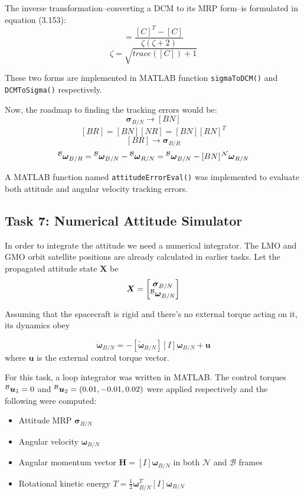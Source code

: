 \documentclass[12pt,a4paper]{report}
\begin{document}
	The inverse transformation--converting a DCM to its MRP form--is formulated in equation (3.153):
	\begin{equation}[\tilde{\boldsymbol{\sigma}}] = \frac{[C]^T - [C]}{\zeta(\zeta+2)} \end{equation}
	$$\zeta = \sqrt{trace([C])+1}$$
	
	These two forms are implemented in MATLAB function \texttt{sigmaToDCM()} and \texttt{DCMToSigma()} respectively. 
	
	Now, the roadmap to finding the tracking errors would be:
	$$\boldsymbol{\sigma}_{B/N} \rightarrow [BN] $$	
	$$[BR] = [BN][NR] = [BN][RN]^T$$
	$$[BR] \rightarrow \boldsymbol{\sigma}_{B/R}$$
	$$\prescript{\mathcal{B}}{}{\boldsymbol{\omega}}_{B/R} = \prescript{\mathcal{B}}{}{\boldsymbol{\omega}}_{B/N} - \prescript{\mathcal{B}}{}{\boldsymbol{\omega}}_{R/N} = \prescript{\mathcal{B}}{}{\boldsymbol{\omega}}_{B/N} - [BN]\prescript{\mathcal{N}}{}{\boldsymbol{\omega}}_{R/N}$$
	
	A MATLAB function named \texttt{attitudeErrorEval()} was implemented to evaluate both attitude and angular velocity tracking errors.
	
	\subsection{Task 7: Numerical Attitude Simulator}
	
	In order to integrate the attitude we need a numerical integrator. The LMO and GMO orbit satellite positions are already calculated in earlier tasks. Let the propagated attitude state $\boldsymbol{X}$ be
	$$\boldsymbol{X} = \begin{bmatrix}
		\boldsymbol{\sigma}_{B/N} \\
		\prescript{\mathcal{B}}{}{\boldsymbol{\omega}}_{B/N}
	\end{bmatrix}$$
	
	Assuming that the spacecraft is rigid and there's no external torque acting on it, its dynamics obey
		
	\begin{equation}
	[I]\dot{\boldsymbol{\omega}}_{B/N} = - [\tilde{\boldsymbol{\omega}}_{B/N}][I]\boldsymbol{\omega}_{B/N} + \boldsymbol{u} 
	\end{equation}
	where $\boldsymbol{u}$ is the external control torque vector.
	
	For this task, a loop integrator was written in MATLAB. The control torques $\prescript{\mathcal{B}}{}{\boldsymbol{u}}_1 = 0$ and $\prescript{\mathcal{B}}{}{\boldsymbol{u}}_2 = (0.01, -0.01, 0.02)$
	were applied respectively and the following were computed:
	\begin{itemize}
		\item Attitude MRP $\boldsymbol{\sigma}_{B/N}$
		\item Angular velocity $\boldsymbol{\omega}_{B/N}$
		\item Angular momentum vector $\boldsymbol{H} = [I]\boldsymbol{\omega}_{B/N}$ in both $\mathcal{N}$ and $\mathcal{B}$ frames
		\item Rotational kinetic energy $T = \frac{1}{2}\boldsymbol{\omega}_{B/N}^T[I]\boldsymbol{\omega}_{B/N}$
	\end{itemize}
	
\end{document}
